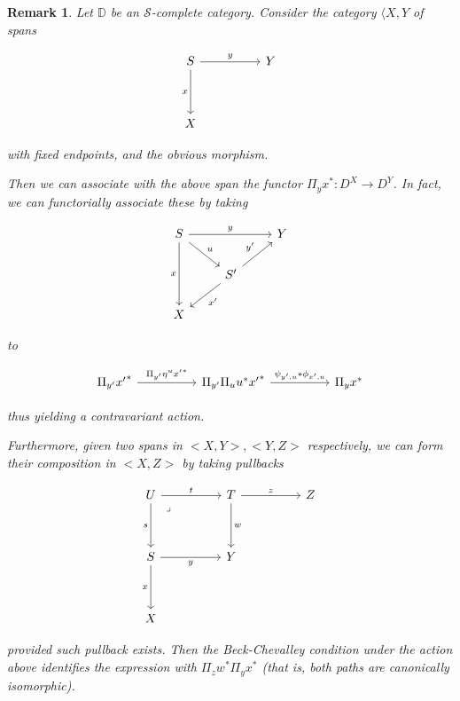 \documentclass[10pt, oneside]{article}
\newtheorem{remark}[theorem]{Remark}
\begin{document}
\begin{remark}\label{rem:span-beck-chevalley}
    Let $\mathbb{D}$ be an $\mathcal{S}$-complete category. Consider the category $\langle{X, Y}$ of spans

    \[\begin{tikzcd}[ampersand replacement=\&]
	S \&\& Y \\
	\\
	X
	\arrow["x"', from=1-1, to=3-1]
	\arrow["y", from=1-1, to=1-3]
    \end{tikzcd}\]


    \noindent with fixed endpoints, and the obvious morphism.

    Then we can associate with the above span the functor $\Pi_y x^\ast: D^X \to D^Y$. In fact, we can functorially associate these by taking

    \[\begin{tikzcd}[ampersand replacement=\&]
	S \&\& Y \\
	\& {S^\prime} \\
	X
	\arrow["x"', from=1-1, to=3-1]
	\arrow["y", from=1-1, to=1-3]
	\arrow["u", from=1-1, to=2-2]
	\arrow["{x^\prime}", from=2-2, to=3-1]
	\arrow["{y^\prime}", from=2-2, to=1-3]
    \end{tikzcd}\]

    \noindent to 

    \[\begin{tikzcd}[ampersand replacement=\&]
	{\Pi_{y^\prime} {x^\prime}^\ast} \&\& {\Pi_{y^\prime} \Pi_u u^\ast {x^\prime}^\ast} \&\& {\Pi_y x^\ast}
	\arrow["{\Pi_{y^\prime} \eta^u {x^\prime}^\ast}", from=1-1, to=1-3]
	\arrow["{\psi_{y^\prime, u} \ast \phi_{x^\prime, u}}", from=1-3, to=1-5]
\end{tikzcd}\]

    \noindent thus yielding a contravariant action.

    Furthermore, given two spans in $<X, Y>, <Y, Z>$ respectively, we can form their composition in $<X, Z>$ by taking pullbacks

    \[\begin{tikzcd}[ampersand replacement=\&]
	U \&\& T \&\& Z \\
	\\
	S \&\& Y \\
	\\
	X
	\arrow["x"', from=3-1, to=5-1]
	\arrow["y"', from=3-1, to=3-3]
	\arrow["w", from=1-3, to=3-3]
	\arrow["z", from=1-3, to=1-5]
	\arrow["s"', from=1-1, to=3-1]
	\arrow["t", from=1-1, to=1-3]
	\arrow["\lrcorner"{anchor=center, pos=0.125}, draw=none, from=1-1, to=3-3]
    \end{tikzcd}\]

    \noindent provided such pullback exists. Then the Beck-Chevalley condition under the action above identifies the expression with $\Pi_z w^\ast \Pi_y x^\ast$ (that is, both paths are canonically isomorphic).
\end{remark}
\end{document}
